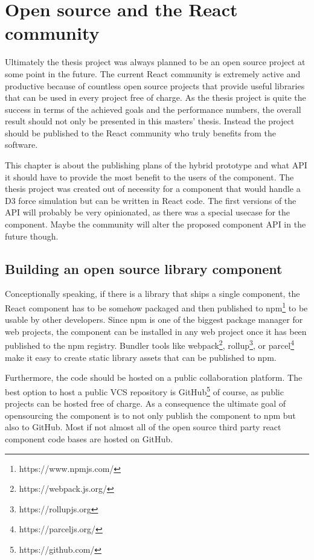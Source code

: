 \chapter{Open source and the React community}
\label{cha:opensource}

Ultimately the thesis project was always planned to be an open source project at some point in the future. The current React community is extremely active and productive because of countless open source projects that provide useful libraries that can be used in every project free of charge. As the thesis project is quite the success in terms of the achieved goals and the performance numbers, the overall result should not only be presented in this masters' thesis. Instead the project should be published to the React community who truly benefits from the software.

This chapter is about the publishing plans of the hybrid prototype and what API it should have to provide the most benefit to the users of the component. The thesis project was created out of necessity for a component that would handle a D3 force simulation but can be written in React code. The first versions of the API will probably be very opinionated, as there was a special usecase for the component. Maybe the community will alter the proposed component API in the future though.

\section{Building an open source library component}

Conceptionally speaking, if there is a library that ships a single component, the React component has to be somehow packaged and then published to npm\footnote{https://www.npmjs.com/} to be usable by other developers. Since npm is one of the biggest package manager for web projects, the component can be installed in any web project once it has been published to the npm registry. Bundler tools like webpack\footnote{https://webpack.js.org/}, rollup\footnote{https://rollupjs.org}, or parcel\footnote{https://parceljs.org/} make it easy to create static library assets that can be published to npm.

Furthermore, the code should be hosted on a public collaboration platform. The best option to host a public VCS repository is GitHub\footnote{https://github.com/} of course, as public projects can be hosted free of charge. As a consequence the ultimate goal of opensourcing the component is to not only publish the component to npm but also to GitHub. Most if not almost all of the open source third party react component code bases are hosted on GitHub.

